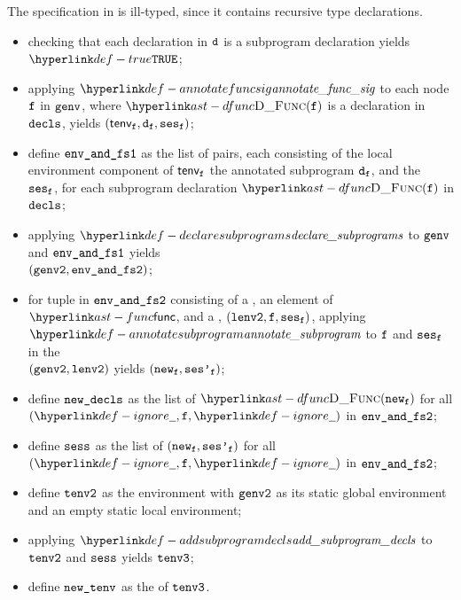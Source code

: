 
The specification in  is ill-typed,
since it contains recursive type declarations.

\ProseParagraph
\AllApply
\begin{itemize}
  \item checking that each declaration in $\texttt{d}$ is a subprogram declaration yields $\True$\ProseTerminateAs{\BadDeclaration};
  \item applying $\annotatefuncsig$ to each node $\texttt{f}$ in $\texttt{genv}$, where $\DFunc(\vf)$ is a declaration in $\texttt{decls}$,
        yields $(\textsf{tenv}_{\texttt{f}}, \texttt{d}_{\texttt{f}}, \texttt{ses}_{\texttt{f}})$\ProseOrTypeError;
  \item define $\texttt{env\_and\_fs1}$ as the list of pairs, each consisting of the local environment component of $\textsf{tenv}_{\texttt{f}}$
        the annotated subprogram $\texttt{d}_{\texttt{f}}$, and the \sideeffectsetterm\ $\texttt{ses}_{\texttt{f}}$, for each subprogram declaration $\DFunc(\vf)$ in $\texttt{decls}$;
  \item applying $\declaresubprograms$ to $\texttt{genv}$ and $\texttt{env\_and\_fs1}$ yields \\
        $(\texttt{genv2}, \texttt{env\_and\_fs2})$\ProseOrTypeError;
  \item for tuple in $\texttt{env\_and\_fs2}$ consisting of a \localstaticenvironmentterm, an element of $\func$,
        and a \sideeffectsetterm, $(\texttt{lenv2}, \texttt{f}, \texttt{ses}_{\texttt{f}})$,
        applying $\annotatesubprogram$ to $\texttt{f}$ and $\texttt{ses}_{\texttt{f}}$ in the \staticenvironmentterm{} \\
        $(\texttt{genv2}, \texttt{lenv2})$ yields $(\texttt{new}_{\texttt{f}}, \texttt{ses'}_{\texttt{f}})$\ProseOrTypeError;
  \item define $\texttt{new\_decls}$ as the list of $\DFunc(\vnew_\vf)$ for all $(\Ignore, \vf, \Ignore)$ in $\texttt{env\_and\_fs2}$;
  \item define $\texttt{sess}$ as the list of $(\texttt{new}_{\texttt{f}}, \texttt{ses'}_{\texttt{f}})$ for all $(\Ignore, \vf, \Ignore)$ in $\texttt{env\_and\_fs2}$;
  \item define $\texttt{tenv2}$ as the environment with $\texttt{genv2}$ as its static global environment
        and an empty static local environment;
  \item applying $\addsubprogramdecls$ to $\texttt{tenv2}$ and $\texttt{sess}$ yields $\texttt{tenv3}$;
  \item define $\texttt{new\_tenv}$ as the \globalstaticenvironmentterm{} of $\texttt{tenv3}$.
\end{itemize}

